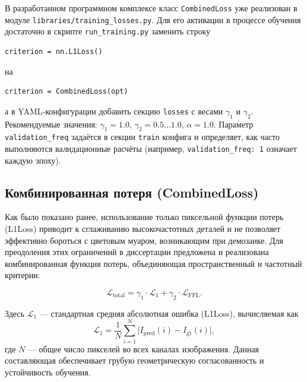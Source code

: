 \documentclass[12pt,a4paper]{article}
\begin{document}
В разработанном программном комплексе класс \texttt{CombinedLoss} уже реализован в модуле \texttt{libraries/training\_losses.py}. Для его активации в процессе обучения достаточно в скрипте \texttt{run\_training.py} заменить строку
\begin{verbatim}
criterion = nn.L1Loss()
\end{verbatim}
на
\begin{verbatim}
criterion = CombinedLoss(opt)
\end{verbatim}
а в YAML-конфигурации добавить секцию \texttt{losses} с весами \(\gamma_1\) и \(\gamma_2\). Рекомендуемые значения: \(\gamma_1 = 1.0\), \(\gamma_2 = 0.5\ldots 1.0\), \(\alpha = 1.0\). Параметр \texttt{validation\_freq} задаётся в секции \texttt{train} конфига и определяет, как часто выполняются валидационные расчёты (например, \texttt{validation\_freq: 1} означает каждую эпоху).

\subsection{Комбинированная потеря (CombinedLoss)}

Как было показано ранее, использование только пиксельной функции потерь (L1Loss) приводит к сглаживанию высокочастотных деталей и не позволяет эффективно бороться с цветовым муаром, возникающим при демозаике. Для преодоления этих ограничений в диссертации предложена и реализована комбинированная функция потерь, объединяющая пространственный и частотный критерии:

\[
\mathcal{L}_{\text{total}} = \gamma_1 \cdot \mathcal{L}_1 + \gamma_2 \cdot \mathcal{L}_{\text{FFL}}.
\]

Здесь \(\mathcal{L}_1\) — стандартная средняя абсолютная ошибка (L1Loss), вычисляемая как
\[
\mathcal{L}_1 = \frac{1}{N}\sum_{i=1}^{N}\bigl|I_{\text{pred}}(i) - I_{\text{gt}}(i)\bigr|,
\]
где \(N\) — общее число пикселей во всех каналах изображения. Данная составляющая обеспечивает грубую геометрическую согласованность и устойчивость обучения.
\end{document}
